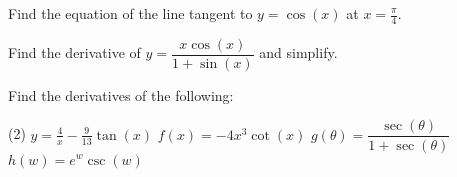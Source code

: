 \documentclass[answers]{exam}
\begin{document}
\begin{ex*}
  Find the equation of the line tangent to $y=\cos(x)$ at $x=\frac{\pi}{4}$.
\end{ex*}
\begin{ex*}
  Find the derivative of $y=\dfrac{x\cos(x)}{1+\sin(x)}$ and simplify.
\end{ex*}
\pagebreak

\begin{center}
\end{center}
\begin{ex*}
  Find the derivatives of the following:
\end{ex*}
\begin{tasks}[after-item-skip=\stretch{1}](2)
  \task[] $y=\frac{4}{x}-\frac{9}{13}\tan(x)$
  \task[] $f(x)=-4x^3\cot(x)$
  \task[] $g(\theta)=\dfrac{\sec(\theta)}{1+\sec(\theta)}$
  \task[] $h(w)=e^w\csc(w)$
\end{tasks}
\pagebreak
\end{document}
